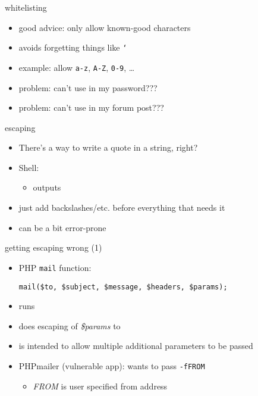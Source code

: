 \begin{frame}{whitelisting}
    \begin{itemize}
        \item good advice: only allow known-good characters
        \item avoids forgetting things like \texttt{`}
        \item example: allow \texttt{a-z}, \texttt{A-Z}, \texttt{0-9}, \ldots
        \item problem: can't use  in my password???
        \item problem: can't use  in my forum post???
    \end{itemize}
\end{frame}

\begin{frame}[fragile,label=escaping]{escaping}
    \begin{itemize}
    \item There's a way to write a quote in a string, right?
    \item Shell: 
        \begin{itemize}
            \item outputs 
        \end{itemize}
    \item just add backslashes/etc. before everything that needs it
    \item can be a bit error-prone
    \end{itemize}
\end{frame}

\begin{frame}[fragile,label=wrongEscaping]{getting escaping wrong (1)}
    \begin{itemize}
    \item PHP \texttt{mail} function:
\begin{verbatim}
mail($to, $subject, $message, $headers, $params);
\end{verbatim}
    \item runs 
    \item does escaping of \textit{\$params} to 
    \item is intended to allow multiple additional parameters to be passed
    \item<2> PHPmailer (vulnerable app): wants to pass \texttt{-fFROM} 
        \begin{itemize}
        \item \textit{FROM} is user specified from address
        \end{itemize}
\end{itemize}
\end{frame}

